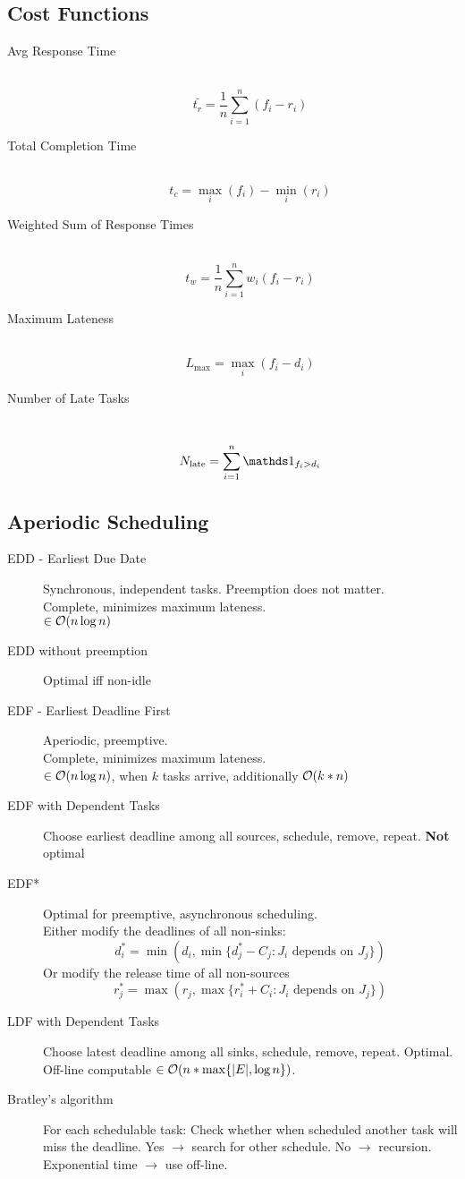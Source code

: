 \subsection{Cost Functions}
\begin{description}
	\item[Avg Response Time] \ 
	\[ \bar{t_r} = \frac{1}{n}\sum_{i=1}^n(f_i-r_i) \]
	\item[Total Completion Time] \ 
	\[ t_c = \max_i(f_i) - \min_i(r_i) \]
	\item[Weighted Sum of Response Times]\ 
	\[ t_w = \frac{1}{n}\sum_{i=1}^nw_i(f_i-r_i) \]
	\item[Maximum Lateness] \ 
	\[ L_{\max} = \max_i(f_i - d_i) \]
	\item[Number of Late Tasks] \ 
	\[ N_{\text{late}} = \sum_{i=1}^n \INDICATOR{f_i > d_i} \]
\end{description}

\subsection{Aperiodic Scheduling}
\begin{description}
	\item[EDD - Earliest Due Date] Synchronous, independent tasks. Preemption
	does not matter. \\ Complete, minimizes maximum lateness.\\ $\in \operatorname{\mathcal{O}}(n
	\log n)$
	\item[EDD without preemption] Optimal iff non-idle
	\item[EDF - Earliest Deadline First] Aperiodic, preemptive.\\ Complete,
	minimizes maximum lateness.\\ $\in \operatorname{\mathcal{O}}(n \log n)$, when $k$ tasks arrive,
	additionally $\operatorname{\mathcal{O}}(k*n)$
	\item[EDF with Dependent Tasks] Choose earliest deadline among all sources,
	schedule, remove, repeat. \textbf{Not} optimal
	\item[EDF*] Optimal for preemptive, asynchronous scheduling.\\
	Either modify the deadlines of all non-sinks:
	\[ d_i^* = \min(d_i, \min\{d_j^* - C_j : J_i \text{ depends on } J_j\}) \]
	Or modify the release time of all non-sources
	\[ r_j^* = \max(r_j, \max\{r_i^* + C_i : J_i \text{ depends on } J_j\}) \]
	\item[LDF with Dependent Tasks] Choose latest deadline among all sinks,
	schedule, remove, repeat. Optimal. Off-line computable $\in \operatorname{\mathcal{O}}(n * \max
	\{|E|, \log n\})$.
	\item[Bratley's algorithm] For each schedulable task: Check whether when
	scheduled another task will miss the deadline. Yes $\rightarrow$ search for
	other schedule. No $\rightarrow$ recursion. \\ 
	Exponential time $\rightarrow$ use off-line.
\end{description}

